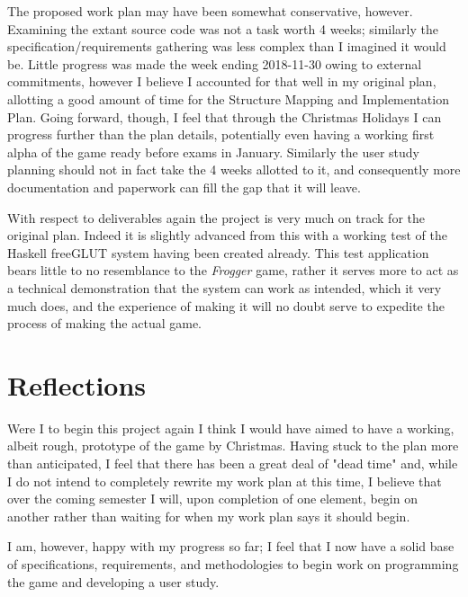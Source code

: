 \documentclass[12pt, a4paper]{report}
\begin{document}
\par

The proposed work plan may have been somewhat conservative, however. 
Examining the extant source code was not a task worth 4 weeks; similarly the specification/requirements gathering was less complex than I imagined it would be.
Little progress was made the week ending 2018-11-30 owing to external commitments, however I believe I accounted for that well in my original plan, allotting a good amount of time for the Structure Mapping and Implementation Plan.
Going forward, though, I feel that through the Christmas Holidays I can progress further than the plan details, potentially even having a working first alpha of the game ready before exams in January.
Similarly the user study planning should not in fact take the 4 weeks allotted to it, and consequently more documentation and paperwork can fill the gap that it will leave.

\par

With respect to deliverables again the project is very much on track for the original plan.
Indeed it is slightly advanced from this with a working test of the Haskell freeGLUT system having been created already.
This test application bears little to no resemblance to the \textit{Frogger} game, rather it serves more to act as a technical demonstration that the system can work as intended, which it very much does, and the experience of making it will no doubt serve to expedite the process of making the actual game.

\section{Reflections}
Were I to begin this project again I think I would have aimed to have a working, albeit rough, prototype of the game by Christmas.
Having stuck to the plan more than anticipated, I feel that there has been a great deal of "dead time" and, while I do not intend to completely rewrite my work plan at this time, I believe that over the coming semester I will, upon completion of one element, begin on another rather than waiting for when my work plan says it should begin.

\par

I am, however, happy with my progress so far; I feel that I now have a solid base of specifications, requirements, and methodologies to begin work on programming the game and developing a user study.
\end{document}
